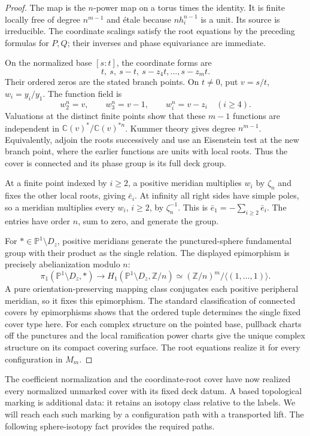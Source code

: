\documentclass[11pt]{article}
\newcommand{\C}{\mathbb C}
\newcommand{\Z}{\mathbb Z}
\newcommand{\PP}{\mathbb P}
\theoremstyle{plain}
\theoremstyle{definition}
\theoremstyle{remark}
\numberwithin{equation}{section}
\begin{document}
\begin{proof}
The map is the \(n\)-power map on a torus times the identity.
It is finite locally free of degree \(n^{m-1}\) and \'{e}tale
because \(n h_i^{n-1}\) is a unit.  Its source is irreducible.
The coordinate scalings satisfy the root equations by the
preceding formulas for \(P,Q\); their inverses and phase
equivariance are immediate.

On the normalized base \([s:t]\), the coordinate forms are
\[
 t,\ s,\ s-t,\ s-z_4t,\ldots,s-z_m t.
\]
Their ordered zeros are the stated branch points.  On \(t\ne0\),
put \(v=s/t\), \(w_i=y_i/y_1\).  The function field is
\[
 w_2^n=v,\qquad w_3^n=v-1,\qquad w_i^n=v-z_i\quad(i\geq4).
\]
Valuations at the distinct finite points show that these \(m-1\)
functions are independent in \(\C(v)^*/\C(v)^{*n}\).
Kummer theory gives degree \(n^{m-1}\).  Equivalently, adjoin
the roots successively and use an Eisenstein test at the new
branch point, where the earlier functions are units with local
roots.  Thus the cover is connected and its phase group is
its full deck group.

At a finite point indexed by \(i\geq2\), a positive meridian
multiplies \(w_i\) by \(\zeta_n\) and fixes the other local roots,
giving \(\bar e_i\).  At infinity all right sides have simple
poles, so a meridian multiplies every \(w_i\), \(i\geq2\), by
\(\zeta_n^{-1}\).  This is
\(\bar e_1=-\sum_{i\geq2}\bar e_i\).  The entries have order
\(n\), sum to zero, and generate the group.

For \(*\in\PP^1\setminus D_z\), positive meridians generate the
punctured-sphere fundamental group with their product as the
single relation.  The displayed
epimorphism is precisely abelianization modulo \(n\):
\[
 \pi_1(\PP^1\setminus D_z,*)\to H_1(\PP^1\setminus D_z,\Z/n)
 \simeq(\Z/n)^m/\langle(1,\ldots,1)\rangle .
\]
A pure orientation-preserving mapping class conjugates each positive
peripheral meridian, so it fixes this epimorphism.  The standard
classification of connected covers by epimorphisms shows that the
ordered tuple determines the single fixed cover type here.  For
each complex structure on the pointed base, pullback charts off
the punctures and the local ramification power charts give the
unique complex structure on its compact covering surface.  The
root equations realize it for every configuration in \(M_m\).
\end{proof}

The coefficient normalization and the coordinate-root cover have
now realized every normalized unmarked cover with its fixed deck
datum.  A based topological marking is additional data: it retains
an isotopy class relative to the labels.  We will reach each such
marking by a configuration path with a transported lift.
The following sphere-isotopy fact provides the required paths.
\end{document}

